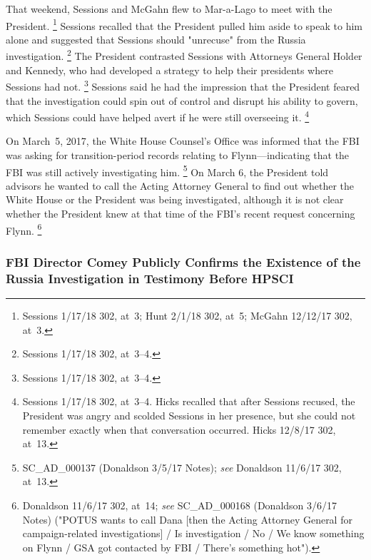 That weekend, Sessions and McGahn flew to Mar-a-Lago to meet with the President.%
\footnote{Sessions 1/17/18 302, at~3;
Hunt 2/1/18 302, at~5;
McGahn 12/12/17 302, at~3.}
Sessions recalled that the President pulled him aside to speak to him alone and suggested that Sessions should "unrecuse" from the Russia investigation.%
\footnote{Sessions 1/17/18 302, at~3--4.}
The President contrasted Sessions with Attorneys General Holder and Kennedy, who had developed a strategy to help their presidents where Sessions had not.%
\footnote{Sessions 1/17/18 302, at~3--4.}
Sessions said he had the impression that the President feared that the investigation could spin out of control and disrupt his ability to govern, which Sessions could have helped avert if he were still overseeing it.%
\footnote{Sessions 1/17/18 302, at~3--4.
Hicks recalled that after Sessions recused, the President was angry and scolded Sessions in her presence, but she could not remember exactly when that conversation occurred.
Hicks 12/8/17 302, at~13.}

On March~5, 2017, the White House Counsel's Office was informed that the FBI was asking for transition-period records relating to Flynn---indicating that the FBI was still actively investigating him.%
\footnote{SC\_AD\_000137 (Donaldson 3/5/17 Notes);
\textit{see} Donaldson 11/6/17 302, at~13.}
On March 6, the President told advisors he wanted to call the Acting Attorney General to find out whether the White House or the President was being investigated, although it is not clear whether the President knew at that time of the FBI's recent request concerning Flynn.%
\footnote{Donaldson 11/6/17 302, at~14;
\textit{see} SC\_AD\_000168 (Donaldson 3/6/17 Notes) ("POTUS wants to call Dana [then the Acting Attorney General for campaign-related investigations] / Is investigation / No / We know something on Flynn / GSA got contacted by FBI / There's something hot").}

\subsubsection{FBI Director Comey Publicly Confirms the Existence of the Russia Investigation in Testimony Before HPSCI}

